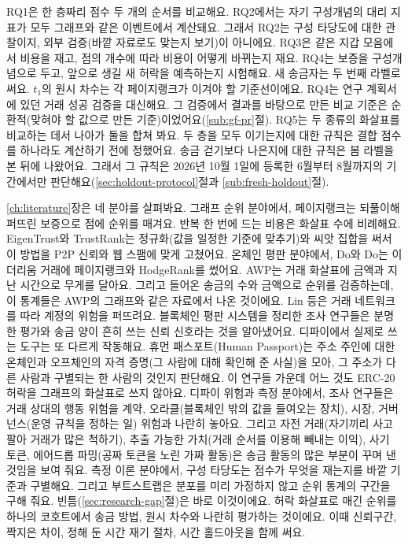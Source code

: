 RQ1은 한 층짜리 점수 두 개의 순서를 비교해요. RQ2에서는 자기 구성개념의 대리 지표가 모두 그래프와 같은 이벤트에서 계산돼요. 그래서 RQ2는 구성 타당도에 대한 관찰이지, 외부 검증(바깥 자료로도 맞는지 보기)이 아니에요. RQ3은 같은 지갑 모음에서 비용을 재고, 점의 개수에 따라 비용이 어떻게 바뀌는지 재요. RQ4는 보증을 구성개념으로 두고, 앞으로 생길 새 허락을 예측하는지 시험해요. 새 송금자는 두 번째 라벨로 써요. $t_1$의 원시 차수는 각 페이지랭크가 이겨야 할 기준선이에요. RQ4는 연구 계획서에 있던 거래 성공 검증을 대신해요. 그 검증에서 결과를 바탕으로 만든 비교 기준은 순환적(맞혀야 할 값으로 만든 기준)이었어요(\ref{sub:gf-pr}절). RQ5는 두 종류의 화살표를 비교하는 데서 나아가 둘을 합쳐 봐요. 두 층을 모두 이기는지에 대한 규칙은 결합 점수를 하나라도 계산하기 전에 정했어요. 송금 걷기보다 나은지에 대한 규칙은 봄 라벨을 본 뒤에 나왔어요. 그래서 그 규칙은 2026년 10월 1일에 등록한 6월부터 8월까지의 기간에서만 판단해요(\ref{sec:holdout-protocol}절과 \ref{sub:fresh-holdout}절).


\ref{ch:literature}장은 네 분야를 살펴봐요. 그래프 순위 분야에서, 페이지랭크는 되풀이해 퍼뜨린 보증으로 점에 순위를 매겨요. 반복 한 번에 드는 비용은 화살표 수에 비례해요. EigenTrust와 TrustRank는 정규화(값을 일정한 기준에 맞추기)와 씨앗 집합을 써서 이 방법을 P2P 신뢰와 웹 스팸에 맞게 고쳤어요. 온체인 평판 분야에서, Do와 Do는 이더리움 거래에 페이지랭크와 HodgeRank를 썼어요. AWP는 거래 화살표에 금액과 지난 시간으로 무게를 달아요. 그리고 들어온 송금의 수와 금액으로 순위를 검증하는데, 이 통계들은 AWP의 그래프와 같은 자료에서 나온 것이에요. Lin 등은 거래 네트워크를 따라 계정의 위험을 퍼뜨려요. 블록체인 평판 시스템을 정리한 조사 연구들은 분명한 평가와 송금 양이 흔히 쓰는 신뢰 신호라는 것을 알아냈어요. 디파이에서 실제로 쓰는 도구는 또 다르게 작동해요. 휴먼 패스포트(Human Passport)는 주소 주인에 대한 온체인과 오프체인의 자격 증명(그 사람에 대해 확인해 준 사실)을 모아, 그 주소가 다른 사람과 구별되는 한 사람의 것인지 판단해요. 이 연구들 가운데 어느 것도 ERC-20 허락을 그래프의 화살표로 쓰지 않아요. 디파이 위험과 측정 분야에서, 조사 연구들은 거래 상대의 행동 위험을 계약, 오라클(블록체인 밖의 값을 들여오는 장치), 시장, 거버넌스(운영 규칙을 정하는 일) 위험과 나란히 놓아요. 그리고 자전 거래(자기끼리 사고팔아 거래가 많은 척하기), 추출 가능한 가치(거래 순서를 이용해 빼내는 이익), 사기 토큰, 에어드롭 파밍(공짜 토큰을 노린 가짜 활동)은 송금 활동의 많은 부분이 꾸며 낸 것임을 보여 줘요. 측정 이론 분야에서, 구성 타당도는 점수가 무엇을 재는지를 바깥 기준과 구별해요. 그리고 부트스트랩은 분포를 미리 가정하지 않고 순위 통계의 구간을 구해 줘요. 빈틈(\ref{sec:research-gap}절)은 바로 이것이에요. 허락 화살표로 매긴 순위를 하나의 코호트에서 송금 방법, 원시 차수와 나란히 평가하는 것이에요. 이때 신뢰구간, 짝지은 차이, 정해 둔 시간 재기 절차, 시간 홀드아웃을 함께 써요.

